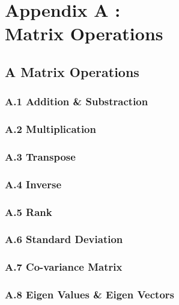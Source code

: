 \chapter{Appendix A : \\Matrix Operations}
\section*{A Matrix Operations}
\subsection*{A.1 Addition \& Substraction}
\subsection*{A.2 Multiplication}
\subsection*{A.3 Transpose}
\subsection*{A.4 Inverse}
\subsection*{A.5 Rank}
\subsection*{A.6 Standard Deviation}
\subsection*{A.7 Co-variance Matrix}
\subsection*{A.8 Eigen Values \& Eigen Vectors}

